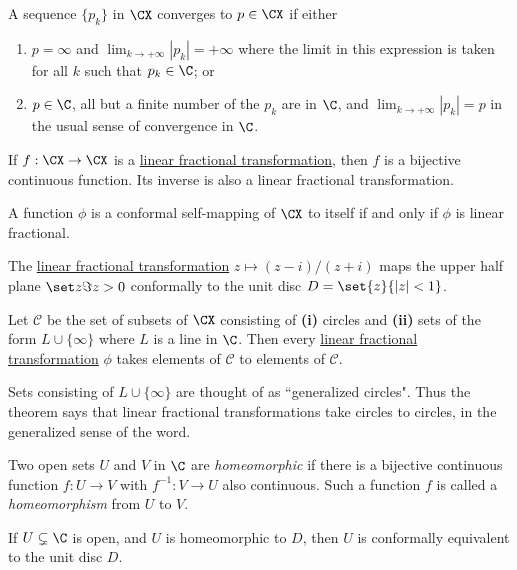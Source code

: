 \Definition{}\label{a2b8117}

A sequence $\{p_k\}$ in $\CX$ converges to $p\in\CX$ if either
\begin{enumerate}
  \item $p=\infty$ and $\lim_{k\to+\infty}|p_k|=+\infty$ where the limit in this
        expression is taken for all $k$ such that $p_k\in\C$; or
  \item $p\in\C$, all but a finite number of the $p_k$ are in $\C$, and
        $\lim_{k\to+\infty}|p_k|=p$ in the usual sense of convergence in $\C$.
\end{enumerate}

\Theorem{}\label{e521731}

If $f:\CX\to\CX$ is a \href{f46e597}{linear fractional transformation}, then
$f$ is a bijective continuous function. Its inverse is also a linear fractional
transformation.

\Theorem{}\label{a7b9b92}

A function $\phi$ is a conformal self-mapping of $\CX$ to itself if and only if
$\phi$ is linear fractional.

\label{f17d4d9}

The \href{f46e597}{linear fractional transformation} $z\mapsto (z-i)/(z+i)$
maps the upper half plane $\set z{\Im z>0}$ conformally to the unit disc
$D=\set{z}{|z|<1}$.

\Theorem{}\label{d07b1b4}

Let $\mathcal C$ be the set of subsets of $\CX$ consisting of \textbf{(i)}
circles and \textbf{(ii)} sets of the form $L\cup\{\infty\}$ where $L$ is a
line in $\C$. Then every \href{f46e597}{linear fractional transformation}
$\phi$ takes elements of $\mathcal C$ to elements of $\mathcal C$.

Sets consisting of $L\cup\{\infty\}$ are thought of as ``generalized circles".
Thus the theorem says that linear fractional transformations take circles to
circles, in the generalized sense of the word.

\label{c429605}

Two open sets $U$ and $V$ in $\C$ are \textit{homeomorphic} if there is a
bijective continuous function $f:U\to V$ with $f^{-1}:V\to U$ also continuous.
Such a function $f$ is called a \textit{homeomorphism} from $U$ to $V$.

\label{faf0cb5}

If $U\subsetneq\C$ is open, and $U$ is homeomorphic to $D$, then $U$ is
conformally equivalent to the unit disc $D$.

